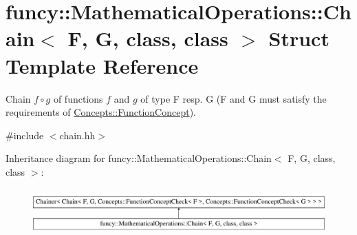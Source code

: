 \hypertarget{structfuncy_1_1MathematicalOperations_1_1Chain}{\section{funcy\-:\-:Mathematical\-Operations\-:\-:Chain$<$ F, G, class, class $>$ Struct Template Reference}
\label{structfuncy_1_1MathematicalOperations_1_1Chain}
}


Chain $ f\circ g $ of functions $f$ and $g$ of type F resp. G (F and G must satisfy the requirements of \hyperlink{structfuncy_1_1Concepts_1_1FunctionConcept}{Concepts\-::\-Function\-Concept}).  




{\ttfamily \#include $<$chain.\-hh$>$}

Inheritance diagram for funcy\-:\-:Mathematical\-Operations\-:\-:Chain$<$ F, G, class, class $>$\-:\begin{figure}[H]
\begin{center}
\leavevmode
\includegraphics[height=1.758242cm]{structfuncy_1_1MathematicalOperations_1_1Chain}
\end{center}
\end{figure}
